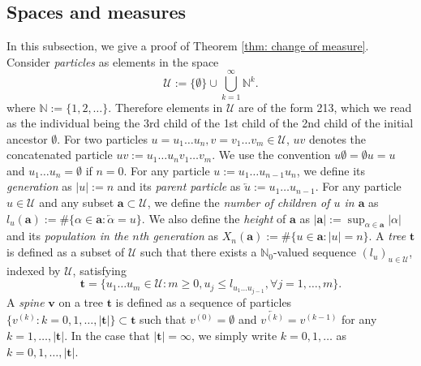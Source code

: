 \documentclass[12pt,a4paper]{amsart}
\numberwithin{equation}{section}
\begin{document}
\subsection{Spaces and measures}
\label{sec:spacesandmeasures}
	In this subsection, we give a proof of Theorem \ref{thm: change of measure}.
 	Consider \emph{particles} as elements in the space
\begin{equation*}
		\mathcal U
	:=
		\{\emptyset\}\cup\bigcup_{k=1}^\infty \mathbb N^k.
\end{equation*}
	where $\mathbb N:=\{1,2,\dots\}$.
	Therefore elements in $\mathcal U$ are of the form 213, which we read as the individual being the 3rd child of the 1st child of the 2nd child of the initial ancestor $\emptyset$.
	For two particles $u=u_1\dots u_n, v=v_1\dots v_m\in\mathcal U$, $uv$ denotes the concatenated particle $uv:=u_1\dots u_nv_1\dots v_m$.
	We use the convention $u\emptyset = \emptyset u = u$ and $u_1\dots u_n=\emptyset$ if $n=0$.
	For any particle $u:=u_1\dots u_{n-1}u_n$, we define its \emph{generation} as $| u |:=n$ and its \emph{parent particle} as $\overleftarrow{u}:=u_1\dots u_{n-1}$.
	For any particle $u \in \mathcal U$ and any subset $\mathbf a \subset \mathcal U$, we define the \emph{number of children of $u$ in $\mathbf a$} as $l_u(\mathbf a) := \#\{\alpha\in \mathbf a:\overleftarrow{\alpha}=u\} $.
	We also define the \emph{height} of $\mathbf a$ as $|\mathbf a|:=\sup_{\alpha\in \mathbf a}|\alpha|$ and its \emph{population in the $n$th generation} as $X_n(\mathbf a):=\#\{u\in \mathbf a:|u|=n\}$.
	A \emph{tree} $ \mathbf t $ is defined as a subset of $\mathcal U$ such that there exists a $\mathbb N_0$-valued sequence $(l_u)_{u\in \mathcal U}$, indexed by $\mathcal U$, satisfying
\begin{equation*}
		 \mathbf t 
	=
		\{u_1\dots u_m\in \mathcal U: m\ge 0, u_j\leq l_{u_1\dots u_{j-1}}, \forall  j=1,\dots,m\}.
\end{equation*}
	A \emph{spine} $ \mathbf v$ on a  tree $ \mathbf t $ is defined as a sequence of particles $\{v^{(k)}:k=0,1,\dots,| \mathbf t |\}\subset \mathbf t $ such that $v^{(0)}=\emptyset$ and $\overleftarrow{v^{(k)}}=v^{(k-1)}$ for any $k=1,\dots, | \mathbf t |$.
	In the case that $| \mathbf t |=\infty$, we simply write $k=0,1,\dots$ as $k=0,1,\dots, | \mathbf t |$.
\end{document}
